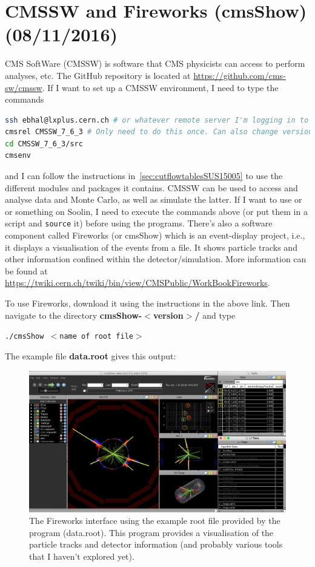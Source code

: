 
\chapter{CMSSW and Fireworks (cmsShow) (08/11/2016)}
\label{sec:fireworks}

CMS SoftWare (CMSSW) is software that CMS physicists can access to perform analyses, etc. The GitHub repository is located at \url{https://github.com/cms-sw/cmssw}. If I want to set up a CMSSW environment, I need to type the commands

\begin{lstlisting}[belowskip=-0.7cm, language=sh, numbers=none]
ssh ebhal@lxplus.cern.ch # or whatever remote server I'm logging in to
cmsrel CMSSW_7_6_3 # Only need to do this once. Can also change version I'm working with
cd CMSSW_7_6_3/src
cmsenv
\end{lstlisting}

and I can follow the instructions in~\ref{sec:cutflowtablesSUS15005} to use the different modules and packages it contains. CMSSW can be used to access and analyse data and Monte Carlo, as well as simulate the latter. If I want to use \madgraph or \madanalysis or something on Soolin, I need to execute the commands above (or put them in a script and \texttt{source} it) before using the programs. There's also a software component called Fireworks (or cmsShow) which is an event-display project, i.e., it displays a visualisation of the events from a \ROOT file. It shows particle tracks and other information confined within the detector/simulation. More information can be found at \url{https://twiki.cern.ch/twiki/bin/view/CMSPublic/WorkBookFireworks}.

To use Fireworks, download it using the instructions in the above link. Then navigate to the directory \textbf{cmsShow-$<$version$>$/} and type

\texttt{./cmsShow $<$name of root file$>$}

The example file \textbf{data.root} gives this output:

\begin{figure}[htbp]
\centering
\includegraphics[width=\textwidth]{figures/fireworksexample.png}
\caption{The Fireworks interface using the example root file provided by the program (data.root). This program provides a visualisation of the particle tracks and detector information (and probably various tools that I haven't explored yet).}
\end{figure}

